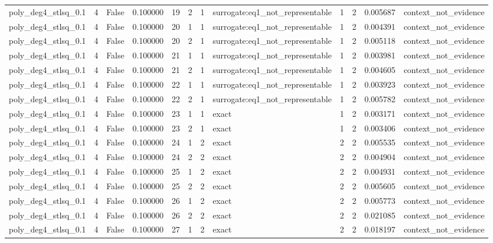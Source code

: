 \begin{tabular}{lrrrrrrlrrrl}
poly\_deg4\_stlsq\_0.1 & 4 & False & 0.100000 & 19 & 2 & 1 & surrogate:eq1\_not\_representable & 1 & 2 & 0.005687 & context\_not\_evidence \\
poly\_deg4\_stlsq\_0.1 & 4 & False & 0.100000 & 20 & 1 & 1 & surrogate:eq1\_not\_representable & 1 & 2 & 0.004391 & context\_not\_evidence \\
poly\_deg4\_stlsq\_0.1 & 4 & False & 0.100000 & 20 & 2 & 1 & surrogate:eq1\_not\_representable & 1 & 2 & 0.005118 & context\_not\_evidence \\
poly\_deg4\_stlsq\_0.1 & 4 & False & 0.100000 & 21 & 1 & 1 & surrogate:eq1\_not\_representable & 1 & 2 & 0.003981 & context\_not\_evidence \\
poly\_deg4\_stlsq\_0.1 & 4 & False & 0.100000 & 21 & 2 & 1 & surrogate:eq1\_not\_representable & 1 & 2 & 0.004605 & context\_not\_evidence \\
poly\_deg4\_stlsq\_0.1 & 4 & False & 0.100000 & 22 & 1 & 1 & surrogate:eq1\_not\_representable & 1 & 2 & 0.003923 & context\_not\_evidence \\
poly\_deg4\_stlsq\_0.1 & 4 & False & 0.100000 & 22 & 2 & 1 & surrogate:eq1\_not\_representable & 1 & 2 & 0.005782 & context\_not\_evidence \\
poly\_deg4\_stlsq\_0.1 & 4 & False & 0.100000 & 23 & 1 & 1 & exact & 1 & 2 & 0.003171 & context\_not\_evidence \\
poly\_deg4\_stlsq\_0.1 & 4 & False & 0.100000 & 23 & 2 & 1 & exact & 1 & 2 & 0.003406 & context\_not\_evidence \\
poly\_deg4\_stlsq\_0.1 & 4 & False & 0.100000 & 24 & 1 & 2 & exact & 2 & 2 & 0.005535 & context\_not\_evidence \\
poly\_deg4\_stlsq\_0.1 & 4 & False & 0.100000 & 24 & 2 & 2 & exact & 2 & 2 & 0.004904 & context\_not\_evidence \\
poly\_deg4\_stlsq\_0.1 & 4 & False & 0.100000 & 25 & 1 & 2 & exact & 2 & 2 & 0.004931 & context\_not\_evidence \\
poly\_deg4\_stlsq\_0.1 & 4 & False & 0.100000 & 25 & 2 & 2 & exact & 2 & 2 & 0.005605 & context\_not\_evidence \\
poly\_deg4\_stlsq\_0.1 & 4 & False & 0.100000 & 26 & 1 & 2 & exact & 2 & 2 & 0.005773 & context\_not\_evidence \\
poly\_deg4\_stlsq\_0.1 & 4 & False & 0.100000 & 26 & 2 & 2 & exact & 2 & 2 & 0.021085 & context\_not\_evidence \\
poly\_deg4\_stlsq\_0.1 & 4 & False & 0.100000 & 27 & 1 & 2 & exact & 2 & 2 & 0.018197 & context\_not\_evidence \\

\end{tabular}
